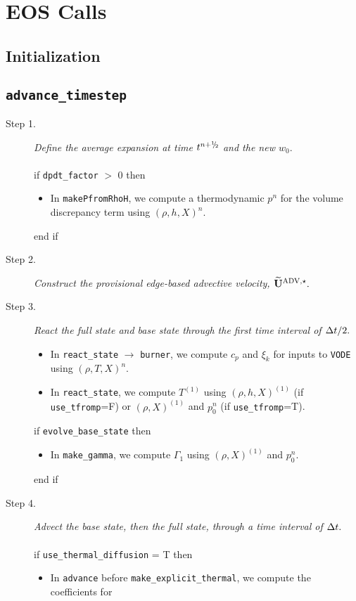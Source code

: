 \section{EOS Calls}
\subsection{Initialization}
\subsection{{\tt advance\_timestep}}
\begin{description}
\item[Step 1.] {\em Define the average expansion at time $t^\nph$ and the new $w_0.$}\\ \\
if {\tt dpdt\_factor} $>$ 0 then
\begin{itemize}
\item In {\tt makePfromRhoH}, we compute a thermodynamic $p^n$ for the volume discrepancy 
term using $(\rho,h,X)^n$.
\end{itemize}
end if
\item[Step 2.] {\em Construct the provisional edge-based advective velocity, $\widetilde{\mathbf{U}}^{\mathrm{ADV},\star}.$}
\item[Step 3.] {\em React the full state and base state through the first time interval 
of $\Delta t/2.$}
\begin{itemize}
\item In {\tt react\_state} $\rightarrow$ {\tt burner}, we compute $c_p$ and $\xi_k$ 
for inputs to {\tt VODE} using $(\rho,T,X)^n$.
\item In {\tt react\_state}, we compute $T^{(1)}$ using $(\rho,h,X)^{(1)}$ 
(if {\tt use\_tfromp}=F) or $(\rho,X)^{(1)}$ and $p_0^n$ (if {\tt use\_tfromp}=T).
\end{itemize}
if {\tt evolve\_base\_state} then
\begin{itemize}
\item In {\tt make\_gamma}, we compute $\Gamma_1$ using $(\rho,X)^{(1)}$ and $p_0^n$.
\end{itemize}
end if
\item[Step 4.] {\em Advect the base state, then the full state, through a time interval 
of $\Delta t.$}\\ \\
if {\tt use\_thermal\_diffusion} = T then
\begin{itemize}
\item In {\tt advance} before {\tt make\_explicit\_thermal}, we compute the coefficients for 

\end{itemize}
\end{description}
